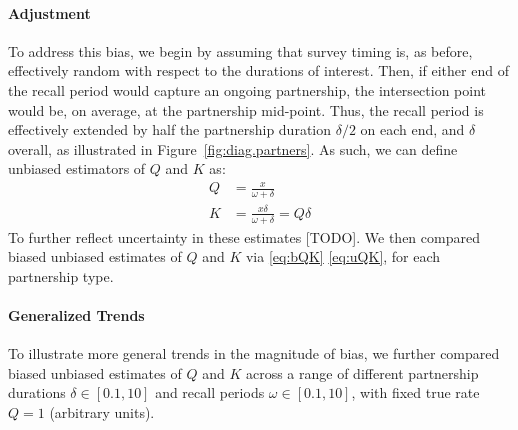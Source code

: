 \paragraph{Adjustment}
To address this bias, we begin by assuming that survey timing is, as before,
effectively random with respect to the durations of interest.
Then, if either end of the recall period would capture an ongoing partnership,
the intersection point would be, on average, at the partnership mid-point.
Thus, the recall period is effectively extended
by half the partnership duration $\delta/2$ on each end, and $\delta$ overall,
as illustrated in Figure~\ref{fig:diag.partners}.
As such, we can define unbiased estimators of $Q$ and $K$ as:
\begin{subequations}\label{eq:uQK}
\begin{alignat}{1}
  Q &= \frac{x}{\omega + \delta}\\
  K &= \frac{x \delta}{\omega + \delta} = Q \delta
\end{alignat}
\end{subequations}
To further reflect uncertainty in these estimates [TODO].
We then compared biased \vs unbiased estimates of $Q$ and $K$
via \eqref{eq:bQK} \vs \eqref{eq:uQK}, for each partnership type.
\paragraph{Generalized Trends}
To illustrate more general trends in the magnitude of bias,
we further compared biased \vs unbiased estimates of $Q$ and $K$ across
a range of different partnership durations $\delta \in [0.1, 10]$ and
recall periods $\omega \in [0.1, 10]$,
with fixed true rate $Q = 1$ (arbitrary units).
